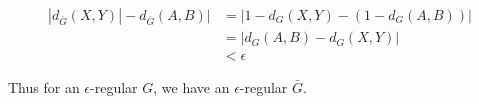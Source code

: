 \documentclass[11pt]{article}
\begin{document}
\begin{align*}
    |d_{\bar{G}}(X, Y)| - d_{\bar{G}}(A, B)| &= |1 - d_G(X, Y) - (1 - d_G(A, B))| \\
    &= |d_G(A, B) - d_G(X, Y)| \\
    &< \epsilon
\end{align*}

Thus for an $\epsilon$-regular $G$, we have an $\epsilon$-regular $\bar{G}$.



%
% 
% 
\end{document}

